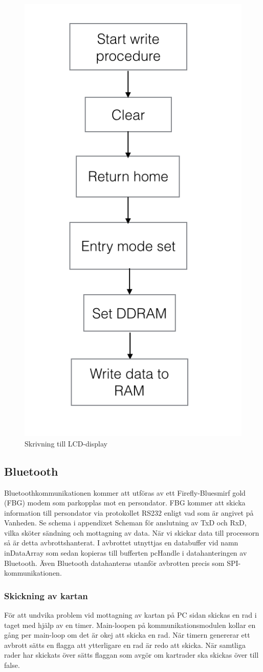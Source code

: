 \documentclass[a4paper,12pt,fleqn]{article}
\begin{document}
\begin{figure}[htp] %
  \begin{center}
  \includegraphics[keepaspectratio=true,width=0.5\linewidth]{bilder/write}  %
  \end{center}
  \caption{Skrivning till LCD-display} %
  \label{fig:flowlcdwrite}
\end{figure}

\subsection{Bluetooth}
Bluetoothkommunikationen kommer att utföras av ett Firefly-Bluesmirf gold (FBG) modem som parkopplas mot en persondator.
FBG kommer att skicka information till persondator via protokollet RS232 enligt vad som är angivet på Vanheden. 
Se schema i appendixet Scheman för anslutning av TxD och RxD, vilka sköter sändning och mottagning av data.
När vi skickar data till processorn så är detta avbrottshanterat. I avbrottet utnyttjas en databuffer vid namn inDataArray som sedan kopieras till bufferten pcHandle i datahanteringen av Bluetooth. Även Bluetooth datahanteras utanför avbrotten precis som SPI-kommunikationen.

\subsubsection{Skickning av kartan}
För att undvika problem vid mottagning av kartan på PC sidan skickas en rad i taget med hjälp av en timer. Main-loopen på kommunikationsmodulen kollar en gång per main-loop om det är okej att skicka en rad. När timern genererar ett avbrott sätts en flagga att ytterligare en rad är redo att skicka. När samtliga rader har skickats över sätts flaggan som avgör om kartrader ska skickas över till false. 
\end{document}
